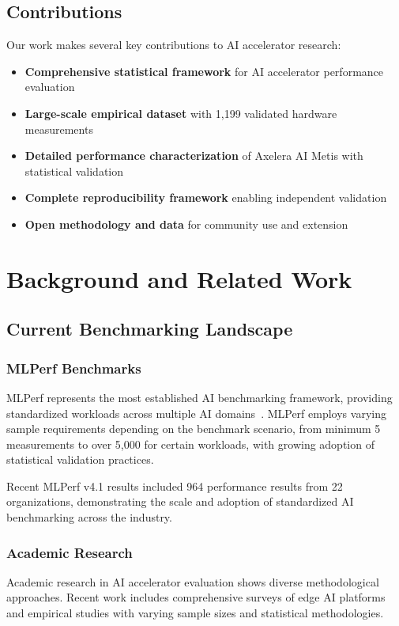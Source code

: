 \documentclass[manuscript]{acmart}
\begin{document}
\subsection{Contributions}

Our work makes several key contributions to AI accelerator research:

\begin{itemize}
    \item \textbf{Comprehensive statistical framework} for AI accelerator performance evaluation
    \item \textbf{Large-scale empirical dataset} with 1,199 validated hardware measurements
    \item \textbf{Detailed performance characterization} of Axelera AI Metis with statistical validation
    \item \textbf{Complete reproducibility framework} enabling independent validation
    \item \textbf{Open methodology and data} for community use and extension
\end{itemize}

\section{Background and Related Work}

\subsection{Current Benchmarking Landscape}

\subsubsection{MLPerf Benchmarks}
MLPerf represents the most established AI benchmarking framework, providing standardized workloads across multiple AI domains~\cite{isca_benchmark2020}. MLPerf employs varying sample requirements depending on the benchmark scenario, from minimum 5 measurements to over 5,000 for certain workloads, with growing adoption of statistical validation practices.

Recent MLPerf v4.1 results included 964 performance results from 22 organizations, demonstrating the scale and adoption of standardized AI benchmarking across the industry.

\subsubsection{Academic Research}
Academic research in AI accelerator evaluation shows diverse methodological approaches. Recent work includes comprehensive surveys of edge AI platforms~\cite{benchmarking_edge2024,edge_computing_survey2024} and empirical studies with varying sample sizes and statistical methodologies.
\end{document}
